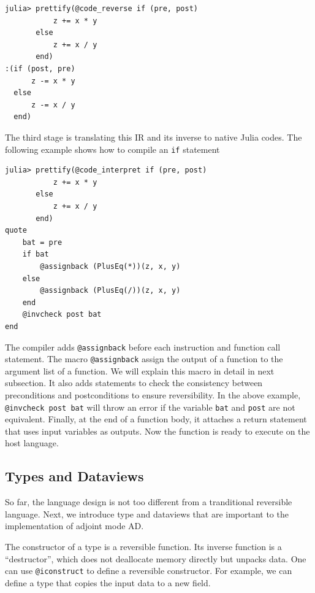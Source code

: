 \documentclass[aps,twocolumn,longbibliography,english,superscriptaddress]{revtex4-1}
\newcommand{\<}{\langle}
\renewcommand{\>}{\rangle}
\theoremstyle{definition}\newtheorem{definition}{\textit{Definition}}
\begin{document}
\begin{minipage}{.44\textwidth}
\begin{lstlisting}
julia> prettify(@code_reverse if (pre, post)
           z += x * y
       else
           z += x / y
       end)
:(if (post, pre)
      z -= x * y
  else
      z -= x / y
  end)
\end{lstlisting}
\end{minipage}

The third stage is translating this IR and its inverse to native Julia codes. The following example shows how to compile an \texttt{if} statement

\begin{minipage}{.44\textwidth}
\begin{lstlisting}
julia> prettify(@code_interpret if (pre, post)
           z += x * y
       else
           z += x / y
       end)
quote
    bat = pre
    if bat
        @assignback (PlusEq(*))(z, x, y)
    else
        @assignback (PlusEq(/))(z, x, y)
    end
    @invcheck post bat
end
\end{lstlisting}
\end{minipage}

The compiler adds \texttt{@assignback} before each instruction and function call statement. The macro \texttt{@assignback} assign the output of a function to the argument list of a function. We will explain this macro in detail in next subsection.
It also adds statements to check the consistency between preconditions and postconditions to ensure reversibility.
In the above example, \texttt{@invcheck post bat} will throw an error if the variable \texttt{bat} and \texttt{post} are not equivalent.
Finally, at the end of a function body, it attaches a return statement that uses input variables as outputs.
Now the function is ready to execute on the host language.

\subsection{Types and Dataviews}
So far, the language design is not too different from a tranditional reversible language.
Next, we introduce type and dataviews that are important to the implementation of adjoint mode AD.

The constructor of a type is a reversible function.
Its inverse function is a ``destructor'', which does not deallocate memory directly but unpacks data.
One can use \texttt{@iconstruct} to define a reversible constructor.
For example, we can define a type that copies the input data to a new field.
\end{document}
